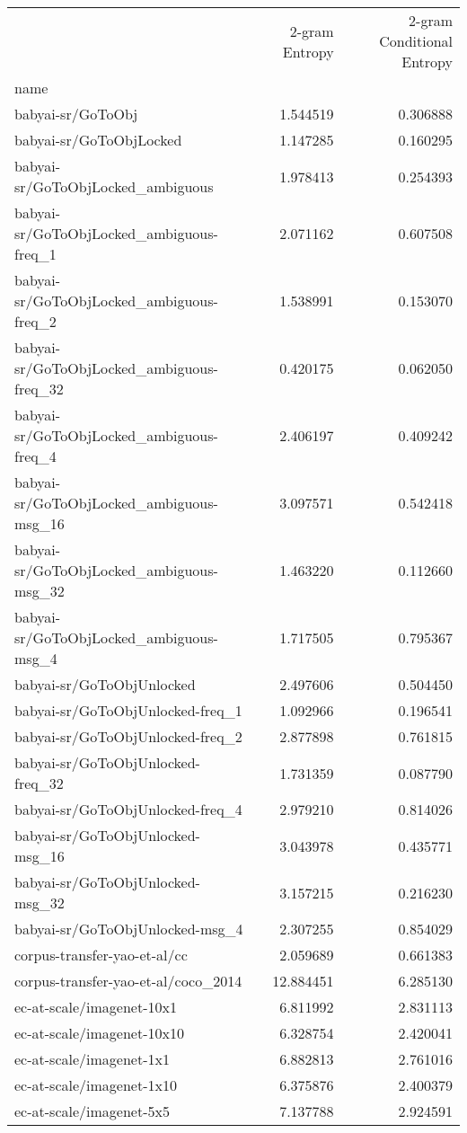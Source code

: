 \begin{tabular}{lrr}
\toprule
 & 2-gram Entropy & 2-gram Conditional Entropy \\
name &  &  \\
\midrule
babyai-sr/GoToObj & 1.544519 & 0.306888 \\
babyai-sr/GoToObjLocked & 1.147285 & 0.160295 \\
babyai-sr/GoToObjLocked\_ambiguous & 1.978413 & 0.254393 \\
babyai-sr/GoToObjLocked\_ambiguous-freq\_1 & 2.071162 & 0.607508 \\
babyai-sr/GoToObjLocked\_ambiguous-freq\_2 & 1.538991 & 0.153070 \\
babyai-sr/GoToObjLocked\_ambiguous-freq\_32 & 0.420175 & 0.062050 \\
babyai-sr/GoToObjLocked\_ambiguous-freq\_4 & 2.406197 & 0.409242 \\
babyai-sr/GoToObjLocked\_ambiguous-msg\_16 & 3.097571 & 0.542418 \\
babyai-sr/GoToObjLocked\_ambiguous-msg\_32 & 1.463220 & 0.112660 \\
babyai-sr/GoToObjLocked\_ambiguous-msg\_4 & 1.717505 & 0.795367 \\
babyai-sr/GoToObjUnlocked & 2.497606 & 0.504450 \\
babyai-sr/GoToObjUnlocked-freq\_1 & 1.092966 & 0.196541 \\
babyai-sr/GoToObjUnlocked-freq\_2 & 2.877898 & 0.761815 \\
babyai-sr/GoToObjUnlocked-freq\_32 & 1.731359 & 0.087790 \\
babyai-sr/GoToObjUnlocked-freq\_4 & 2.979210 & 0.814026 \\
babyai-sr/GoToObjUnlocked-msg\_16 & 3.043978 & 0.435771 \\
babyai-sr/GoToObjUnlocked-msg\_32 & 3.157215 & 0.216230 \\
babyai-sr/GoToObjUnlocked-msg\_4 & 2.307255 & 0.854029 \\
corpus-transfer-yao-et-al/cc & 2.059689 & 0.661383 \\
corpus-transfer-yao-et-al/coco\_2014 & 12.884451 & 6.285130 \\
ec-at-scale/imagenet-10x1 & 6.811992 & 2.831113 \\
ec-at-scale/imagenet-10x10 & 6.328754 & 2.420041 \\
ec-at-scale/imagenet-1x1 & 6.882813 & 2.761016 \\
ec-at-scale/imagenet-1x10 & 6.375876 & 2.400379 \\
ec-at-scale/imagenet-5x5 & 7.137788 & 2.924591 \\

\end{tabular}
